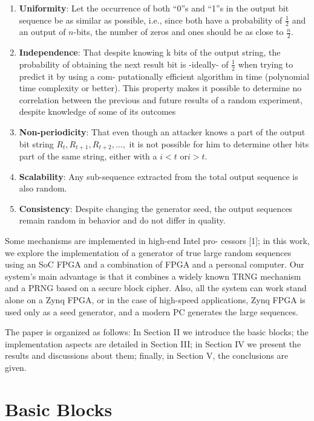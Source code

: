 \documentclass[journal]{IEEEtran}
\begin{document}
\begin{enumerate}
    \item \textbf{Uniformity}: Let the occurrence of both ``0''s and ``1''s in the output bit sequence be as similar as possible, i.e., since both have a probability of $\frac{1}{2}$ and an output of $n$-bits, the number of zeros and ones should be as close to $\frac{n}{2}$.
    \item \textbf{Independence}: That despite knowing k bits of the output string, the probability of obtaining the next result bit is -ideally- of $\frac{1}{2}$ when trying to predict it by using a com- putationally efficient algorithm in time (polynomial time complexity or better). This property makes it possible to determine no correlation between the previous and future results of a random experiment, despite knowledge of some of its outcomes
    \item \textbf{Non-periodicity}: That even though an attacker knows a part of the output bit string $R_{t},R_{t+1},R_{t+2},\ldots,$ it is not possible for him to determine other bits part of the same string, either with a $i < t$ or$ i > t$.
    \item \textbf{Scalability}: Any sub-sequence extracted from the total output sequence is also random.
    \item \textbf{Consistency}: Despite changing the generator seed, the output sequences remain random in behavior and do not differ in quality.    
\end{enumerate}

Some mechanisms are implemented in high-end Intel pro- cessors [1]; in this work, we explore the implementation of a generator of true large random sequences using an SoC FPGA and a combination of FPGA and a personal computer. Our system’s main advantage is that it combines a widely known TRNG mechanism and a PRNG based on a secure block cipher. Also, all the system can work stand alone on a Zynq FPGA, or in the case of high-speed applications, Zynq FPGA is used only as a seed generator, and a modern PC generates the large sequences.

The paper is organized as follows: In Section II we introduce the basic blocks; the implementation aspects are detailed in Section III; in Section IV we present the results and discussions about them; finally, in Section V, the conclusions are given.

\section{Basic Blocks}
\end{document}
